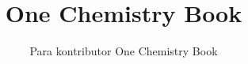 \documentclass[11pt,a4paper,twoside,openany]{book}
\title{One Chemistry Book}
\author{Para kontributor One Chemistry Book}
\date{\bookdate}
\begin{document}
\frontmatter




\tableofcontents

\mainmatter



\appendix
\part{\omsolutionspart}


\backmatter
\renewcommand{\indexspace}{\par\vskip 8pt plus 4pt minus 4pt\relax}
\printindex
\end{document}

